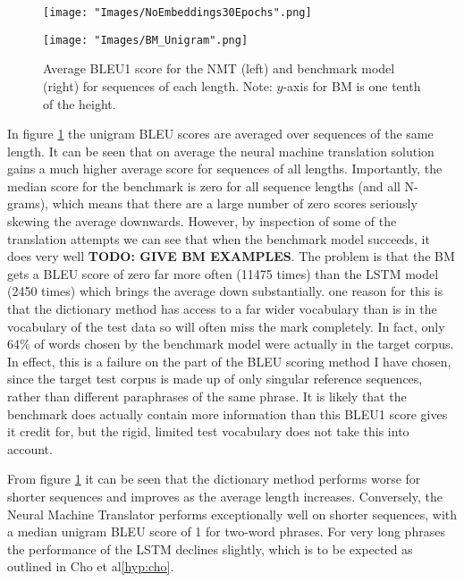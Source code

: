 \documentclass[]{article}
\begin{document}
\begin{figure}[h]
	\centering
	\begin{minipage}[b]{0.48\textwidth}
		\texttt{[image: "Images/NoEmbeddings30Epochs".png]}
	\end{minipage}
	\begin{minipage}[b]{0.48\textwidth}
		\texttt{[image: "Images/BM\_Unigram".png]}
	\end{minipage}
	\caption{Average BLEU1 score for the NMT (left) and benchmark model (right) for sequences of each length. Note: $y$-axis for BM is one tenth of the height.}
	\label{fig:per_sequence}
\end{figure}
In figure \ref{fig:per_sequence} the unigram BLEU scores are averaged over sequences of the same length. It can be seen that on average the neural machine translation solution gains a much higher average score for sequences of all lengths. Importantly, the median score for the benchmark is zero for all sequence lengths (and all N-grams), which means that there are a large number of zero scores seriously skewing the average downwards. However, by inspection of some of the translation attempts we can see that when the benchmark model succeeds, it does very well \textbf{TODO: GIVE BM EXAMPLES}. The problem is that the BM gets a BLEU score of zero far more often (11475 times) than the LSTM model (2450 times) which brings the average down substantially. one reason for this is that the dictionary method has access to a far wider vocabulary than is in the vocabulary of the test data so will often miss the mark completely. In fact, only 64\% of words chosen by the benchmark model were actually in the target corpus. In effect, this is a failure on the part of the BLEU scoring method I have chosen, since the target test corpus is made up of only singular reference sequences, rather than different paraphrases of the same phrase. It is likely that the benchmark does actually contain more information than this BLEU1 score gives it credit for, but the rigid, limited test vocabulary does not take this into account.

From figure \ref{fig:per_sequence} it can be seen that the dictionary method performs worse for shorter sequences and improves as the average length increases. Conversely, the Neural Machine Translator performs exceptionally well on shorter sequences, with a median unigram BLEU score of 1 for two-word phrases. For very long phrases the performance of the LSTM declines slightly, which is to be expected as outlined in Cho et al\ref{hyp:cho}.
\end{document}
